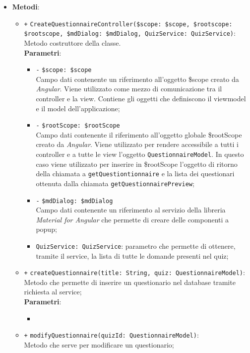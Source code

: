\begin{itemize}
\begin{itemize}
	\end{itemize}
	\item \textbf{Metodi}:
	\begin{itemize}
		\item \texttt{+} \texttt{CreateQuestionnaireController(\$scope: \$scope, \$rootscope: \$rootscope, \$mdDialog: \$mdDialog, QuizService: QuizService)}: \\ Metodo costruttore della classe. \\
		\textbf{Parametri}:
		\begin{itemize}
			\item \texttt{-} \texttt{\$scope: \$scope} \\
			Campo dati contenente un riferimento all’oggetto \$scope creato da \textit{Angular}. Viene utilizzato come mezzo di comunicazione tra il controller e la view. Contiene gli oggetti che definiscono il viewmodel e il model dell’applicazione;
				\item \texttt{-} \texttt{\$rootScope: \$rootScope} \\
				Campo dati contenente il riferimento all'oggetto globale \$rootScope creato da \textit{Angular}. Viene utilizzato per rendere accessibile a tutti i controller e a tutte le view l'oggetto \texttt{QuestionnaireModel}. In questo caso viene utilizzato per inserire in \$rootScope l'oggetto di ritorno della chiamata a \texttt{getQuestiontionnaire} e la lista dei questionari ottenuta dalla chiamata \texttt{getQuestionnairePreview};
			\item \texttt{-} \texttt{\$mdDialog: \$mdDialog} \\
			Campo dati contenente un riferimento al servizio della libreria \textit{Material for Angular} che permette di creare delle componenti a popup;
			\item \texttt{QuizService: QuizService}: parametro che permette di ottenere, tramite il service, la lista di tutte le domande presenti nel quiz;
		\end{itemize}
		\item \texttt{+} \texttt{createQuestionnaire(title: String, quiz: QuestionnaireModel)}: \\Metodo che permette di inserire un questionario nel database tramite richiesta al service; \\
			\textbf{Parametri}:
			\begin{itemize}
				\item 
			\end{itemize}
		\item \texttt{+} \texttt{modifyQuestionnaire(quizId: QuestionnaireModel)}: \\ Metodo che serve per modificare un questionario; \\

\end{itemize}
\end{itemize}
